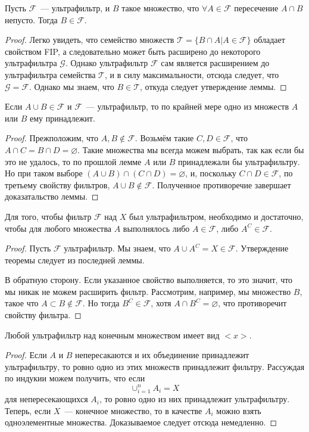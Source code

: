 \begin{lemma}
Пусть $\mathcal{F}$~--- ультрафильтр, и $B$ такое множество, что $\forall A\in\mathcal{F}$ пересечение $A\cap B$ непусто. Тогда $B\in\mathcal{F}$.
\end{lemma}
\begin{proof}
Легко увидеть, что семейство множеств $\mathcal{T} = \{B\cap A| A\in\mathcal{F}\}$ обладает свойством FIP, а следовательно может быть расширено до некоторого ультрафильтра $\mathcal{G}$. Однако ультрафильтр $\mathcal{F}$ сам является расширением до ультрафильтра семейства $\mathcal{T}$, и в силу максимальности, отсюда следует, что $\mathcal{G} = \mathcal{F}$. Однако мы знаем, что $B\in\mathcal{T}$, откуда следует утверждение леммы.
\end{proof}

\begin{lemma}
Если $A\cup B\in\mathcal{F}$ и $\mathcal{F}$~--- ультрафильтр, то по крайней мере одно из множеств $A$ или $B$ ему принадлежит.
\end{lemma}
\begin{proof}
Прежположим, что $A,B\not\in\mathcal{F}$. Возьмём такие $C, D\in\mathcal{F}$, что $A\cap C = B\cap D = \varnothing$. Такие множества мы всегда можем выбрать, так как если бы это не удалось, то по прошлой лемме $A$ или $B$ принадлежали бы ультрафильтру. Но при таком выборе $(A\cup B)\cap(C\cap D) = \varnothing$, и, поскольку $C\cap D\in\mathcal{F}$, по третьему свойству фильтров, $A\cup B \not\in \mathcal{F}$. Полученное противоречие завершает доказатальство леммы.
\end{proof}

\begin{thm}
Для того, чтобы фильтр $\mathcal{F}$ над $X$ был ультрафильтром, необходимо и достаточно, чтобы для любого множества $A$ выполнялось либо $A\in\mathcal{F}$, либо $A^C\in\mathcal{F}$.
\end{thm}
\begin{proof}
Пусть $\mathcal{F}$ ультрафильтр. Мы знаем, что $A\cup A^C = X \in\mathcal{F}$. Утверждение теоремы следует из последней леммы.


В обратную сторону. Если указанное свойство выполняется, то это значит, что мы никак не можем расширить фильтр. Рассмотрим, например, мы множество $B$, такое что $A\subset B\not\in\mathcal{F}$. Но тогда $B^C\in\mathcal{F}$, хотя $A\cap B^C=\varnothing$, что противоречит свойству фильтра.
\end{proof}

\begin{corollary}
Любой ультрафильтр над конечным множеством имеет вид $<x>$.
\end{corollary}
\begin{proof}
Если $A$ и $B$ непересакаются и их объединение принадлежит ультрафильтру, то ровно одно из этих множеств принадлежит фильтру. Рассуждая по индукии можем получить, что если
$$\cup_{i=1}^n A_i = X$$
для непересекающихся $A_i$, то ровно одно из них принадлежит ультрафильтру. Теперь, если $X$~--- конечное множество, то в качестве $A_i$ можно взять одноэлементные множества. Доказываемое следует отсюда немедленно.
\end{proof}

